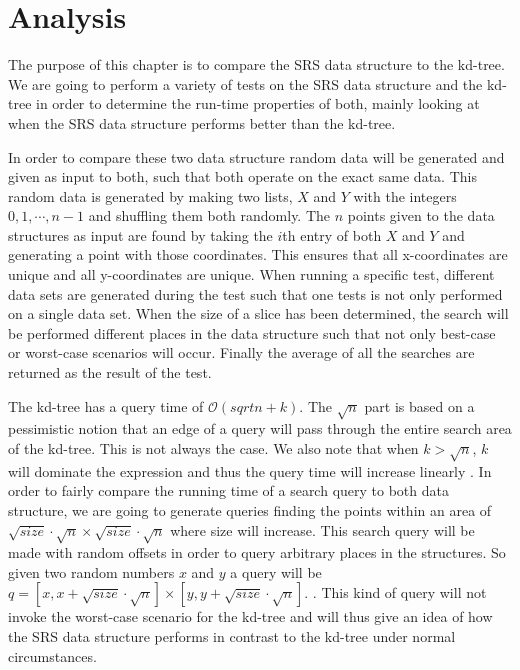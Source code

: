 \chapter{Analysis}
The purpose of this chapter is to compare the SRS data structure to the kd-tree. We are going to perform a variety of tests on the SRS data structure and the kd-tree in order to determine the run-time properties of both, mainly looking at when the SRS data structure performs better than the kd-tree.


In order to compare these two data structure random data will be generated and given as input to both, such that both operate on the exact same data. This random data is generated by making two lists, $X$ and $Y$ with the integers ${0,1,\cdots,n-1}$ and shuffling them both randomly. The $n$ points given to the data structures as input are found by taking the $i$th entry of both $X$ and $Y$ and generating a point with those coordinates. This ensures that all x-coordinates are unique and all y-coordinates are unique.  When running a specific test, different data sets are generated during the test such that one tests is not only performed on a single data set. When the size of a slice has been determined, the search will be performed different places in the data structure such that not only best-case or worst-case scenarios will occur. Finally the average of all the searches are returned as the result of the test.

The kd-tree has a query time of $\mathcal{O}(sqrt{n}+k)$. The $\sqrt{n}$ part is based on a pessimistic notion that an edge of a query will pass through the entire search area of the kd-tree. This is not always the case. We also note that when $k > \sqrt{n}$, $k$ will dominate the expression and thus the query time will increase linearly . In order to fairly compare the running time of a search query to both data structure, we are going to generate queries finding the points within an area of $\sqrt{size}\cdot\sqrt{n} \times \sqrt{size}\cdot\sqrt{n}$ where size will increase. This search query will be made with random offsets in order to query arbitrary places in the structures. So given two random numbers $x$ and $y$ a query will be $q = [x, x+\sqrt{size}\cdot\sqrt{n}] \times [y, y+\sqrt{size}\cdot\sqrt{n}]$. . This kind of query will not invoke the worst-case scenario for the kd-tree and will thus give an idea of how the SRS data structure performs in contrast to the kd-tree under normal circumstances.


